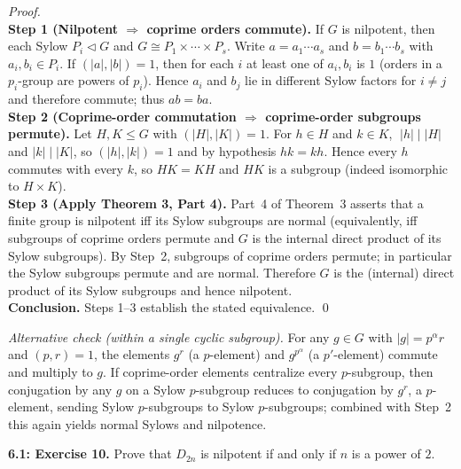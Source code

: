 \documentclass[12pt]{article}
\theoremstyle{definition}
\begin{document}
\dotfill

\emph{Proof.}\\
\textbf{Step 1 (Nilpotent $\Rightarrow$ coprime orders commute).} If $G$ is nilpotent, then each Sylow $P_i\lhd G$ and $G\cong P_1\times\cdots\times P_s$. Write $a=a_1\cdots a_s$ and $b=b_1\cdots b_s$ with $a_i,b_i\in P_i$. If $(|a|,|b|)=1$, then for each $i$ at least one of $a_i,b_i$ is $1$ (orders in a $p_i$-group are powers of $p_i$). Hence $a_i$ and $b_j$ lie in different Sylow factors for $i\neq j$ and therefore commute; thus $ab=ba$.\\

\textbf{Step 2 (Coprime-order commutation $\Rightarrow$ coprime-order subgroups permute).} Let $H,K\le G$ with $(|H|,|K|)=1$. For $h\in H$ and $k\in K$, $\;|h|\mid |H|$ and $|k|\mid |K|$, so $(|h|,|k|)=1$ and by hypothesis $hk=kh$. Hence every $h$ commutes with every $k$, so $HK=KH$ and $HK$ is a subgroup (indeed isomorphic to $H\times K$).\\

\textbf{Step 3 (Apply Theorem 3, Part 4).} Part~4 of Theorem~3 asserts that a finite group is nilpotent iff its Sylow subgroups are normal (equivalently, iff subgroups of coprime orders permute and $G$ is the internal direct product of its Sylow subgroups). By Step~2, subgroups of coprime orders permute; in particular the Sylow subgroups permute and are normal. Therefore $G$ is the (internal) direct product of its Sylow subgroups and hence nilpotent.\\

\medskip
\textbf{Conclusion.} Steps 1–3 establish the stated equivalence. \qed

\dotfill

\emph{Alternative check (within a single cyclic subgroup).}
For any $g\in G$ with $|g|=p^\alpha r$ and $(p,r)=1$, the elements $g^{r}$ (a $p$-element) and $g^{p^\alpha}$ (a $p'$-element) commute and multiply to $g$. If coprime-order elements centralize every $p$-subgroup, then conjugation by any $g$ on a Sylow $p$-subgroup reduces to conjugation by $g^r$, a $p$-element, sending Sylow $p$-subgroups to Sylow $p$-subgroups; combined with Step~2 this again yields normal Sylows and nilpotence.

\newpage

\newpage

\noindent \textbf{6.1: Exercise 10.} Prove that $D_{2n}$ is nilpotent if and only if $n$ is a power of $2$. \\ %
\end{document}
